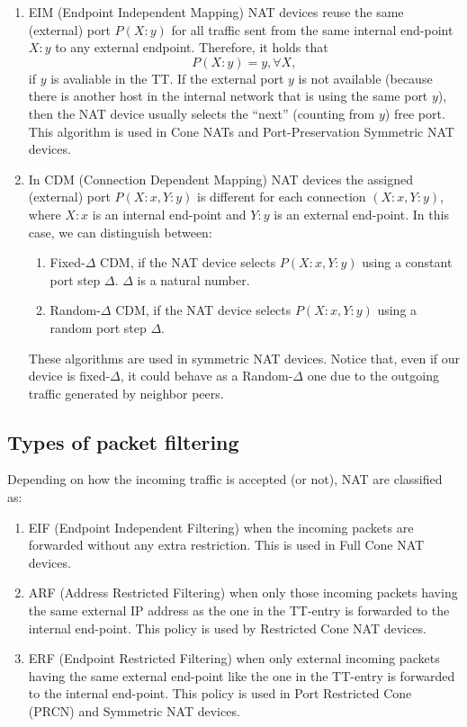 \begin{enumerate}
\item EIM (Endpoint Independent Mapping) NAT devices reuse the same
  (external) port $P(X:y)$ for all traffic sent from the same internal
  end-point $X:y$ to any external endpoint. Therefore, it holds that
  \begin{equation}
    P(X:y)=y, \forall X,
  \end{equation}
  if $y$ is avaliable in the TT. If the external port $y$ is not
  available (because there is another host in the internal network
  that is using the same port $y$), then the NAT device usually
  selects the ``next'' (counting from $y$) free port.  This algorithm
  is used in Cone NATs and Port-Preservation Symmetric NAT devices.
\item In CDM (Connection Dependent Mapping) NAT devices the assigned
  (external) port $P(X:x,Y:y)$ is different for each connection
  $(X:x,Y:y)$, where $X:x$ is an internal end-point and $Y:y$ is an
  external end-point. In this case, we can distinguish between:
  \begin{enumerate}
  \item Fixed-$\Delta$ CDM, if the NAT device selects $P(X:x,Y:y)$
    using a constant port step $\Delta$. $\Delta$ is a natural number.
    \item Random-$\Delta$ CDM, if the NAT device selects $P(X:x,Y:y)$
      using a random port step $\Delta$.
  \end{enumerate}
  These algorithms are used in symmetric NAT devices. Notice that,
  even if our device is fixed-$\Delta$, it could behave as a
  Random-$\Delta$ one due to the outgoing traffic generated by
  neighbor peers.
\end{enumerate}

\subsection{Types of packet filtering}

Depending on how the incoming traffic is accepted (or not), NAT are
classified as:

\begin{enumerate}
\item EIF (Endpoint Independent Filtering) when the incoming packets
  are forwarded without any extra restriction. This is used in Full
  Cone NAT devices.
\item ARF (Address Restricted Filtering) when only those incoming
  packets having the same external IP address as the one in the
  TT-entry is forwarded to the internal end-point. This policy is used
  by Restricted Cone NAT devices.
\item ERF (Endpoint Restricted Filtering) when only external incoming
  packets having the same external end-point like the one in the
  TT-entry is forwarded to the internal end-point. This policy is used
  in Port Restricted Cone (PRCN) and Symmetric NAT devices.
\end{enumerate}


